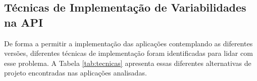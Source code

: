 \subsection{Técnicas de Implementação de Variabilidades na API}
\label{sec:tecnicas}

De forma a permitir a implementação das aplicações contemplando as diferentes versões,
diferentes técnicas de implementação foram identificadas para lidar com esse problema.
A Tabela \ref{tab:tecnicas} apresenta essas diferentes alternativas de projeto
encontradas nas aplicações analisadas.

\begin{table}[ht]
\centering
\caption{Técnicas de implementação de variabilidades na API encontrados nas aplicações}
\label{tab:tecnicas}
\end{table}
